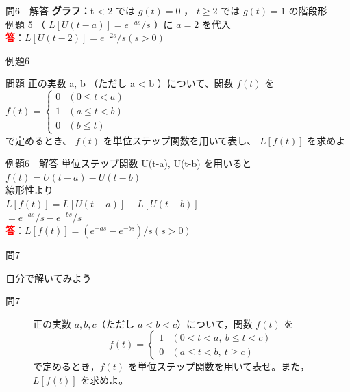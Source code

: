 \documentclass[professionalfonts]{beamer}
\begin{document}
\begin{frame}{問6　解答}
  \textbf{グラフ：}t < 2 では $g(t) = 0$ ， $t \geq 2$ では $g(t) = 1$ の階段形\\[0.3em]
  例題 5 （ $L[U(t-a)] = e^{-as}/s$ ）に $a = 2$ を代入
  \\[8pt]\textcolor{red}{\textbf{答}}：$L[U(t-2)] = e^{-2s}/s  (s > 0)$
\end{frame}

\begin{frame}{例題6}
  \begin{exampleblock}{問題}
    正の実数 a, b （ただし a < b ）について、関数 $f(t)$ を\\[2pt]
    $f(t) = \begin{cases} 0 & (0 \leq t < a) \\ 1 & (a \leq t < b) \\ 0 & (b \leq t) \end{cases}$\\[2pt]
    で定めるとき、 $f(t)$ を単位ステップ関数を用いて表し、 $L[f(t)]$ を求めよ\\[2pt]
  \end{exampleblock}
\end{frame}

\begin{frame}{例題6　解答}
  単位ステップ関数 U(t-a), U(t-b) を用いると\\[4pt]
  $f(t) = U(t-a) - U(t-b)$\\[4pt]
  線形性より\\[4pt]
  $L[f(t)] = L[U(t-a)] - L[U(t-b)]$\\[4pt]
  $= e^{-as}/s - e^{-bs}/s$
  \\[8pt]\textcolor{red}{\textbf{答}}：$L[f(t)] = (e^{-as} - e^{-bs})/s  (s > 0)$
\end{frame}

\begin{frame}{問7}
  \begin{exampleblock}{自分で解いてみよう}
  \begin{description}
    \item[問7] 正の実数 $a, b, c$（ただし $a < b < c$）について，関数 $f(t)$ を
    \[
    f(t) = \begin{cases} 1 & (0 < t < a,\ b \leq t < c) \\ 0 & (a \leq t < b,\ t \geq c) \end{cases}
    \]
    で定めるとき，$f(t)$ を単位ステップ関数を用いて表せ。また，$L[f(t)]$ を求めよ。\\
  \end{description}
  \end{exampleblock}
\end{frame}
\end{document}
